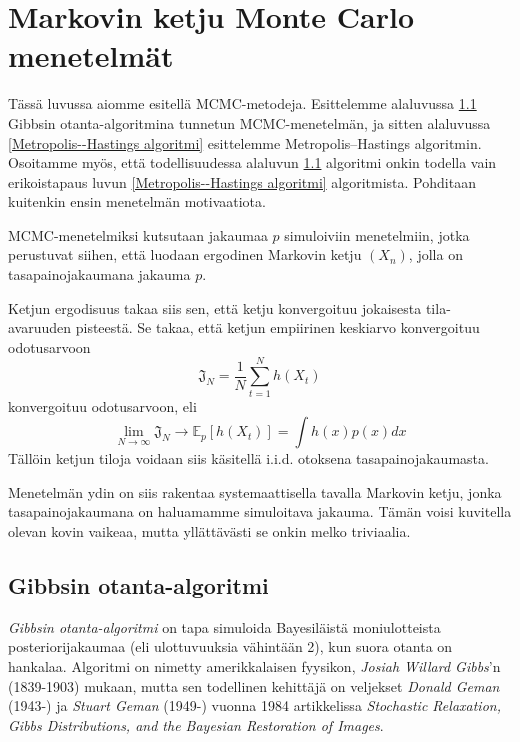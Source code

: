 \chapter{Markovin ketju Monte Carlo menetelmät}

Tässä luvussa aiomme esitellä MCMC-metodeja. Esittelemme alaluvussa \ref{gibbs} Gibbsin otanta-algoritmina tunnetun MCMC-menetelmän, ja sitten alaluvussa \ref{Metropolis--Hastings algoritmi} esittelemme Metropolis--Hastings algoritmin. Osoitamme myös, että todellisuudessa alaluvun \ref{gibbs} algoritmi onkin todella vain erikoistapaus luvun \ref{Metropolis--Hastings algoritmi} algoritmista. Pohditaan kuitenkin ensin menetelmän motivaatiota.
 
\begin{maar}
	MCMC-menetelmiksi kutsutaan jakaumaa $p$ simuloiviin menetelmiin, jotka perustuvat siihen, että luodaan ergodinen Markovin ketju $(X_n)$, jolla on tasapainojakaumana jakauma $p$.
\end{maar}

Ketjun ergodisuus takaa siis sen, että ketju konvergoituu jokaisesta tila-avaruuden pisteestä. Se takaa, että ketjun empiirinen keskiarvo konvergoituu odotusarvoon
\begin{equation}
	\mathfrak{J}_N = \frac{1}{N} \sum_{t=1}^{N} h(X_t)
\end{equation}
konvergoituu odotusarvoon, eli
\begin{equation}
	\lim_{N\to\infty} \mathfrak J_N \to \mathbb{E}_p[h(X_t)] = \int h(x)p(x)dx
\end{equation}
Tällöin ketjun tiloja voidaan siis käsitellä i.i.d. otoksena tasapainojakaumasta.

Menetelmän ydin on siis rakentaa systemaattisella tavalla Markovin ketju, jonka tasapainojakaumana on haluamamme simuloitava jakauma. Tämän voisi kuvitella olevan kovin vaikeaa, mutta yllättävästi se onkin melko triviaalia.

\section{Gibbsin otanta-algoritmi}\label{gibbs}

\textit{Gibbsin otanta-algoritmi} on tapa simuloida Bayesiläistä moniulotteista posteriorijakaumaa (eli ulottuvuuksia vähintään 2), kun suora otanta on hankalaa. Algoritmi on nimetty amerikkalaisen fyysikon, \textit{Josiah Willard Gibbs}'n (1839-1903) mukaan, mutta sen todellinen kehittäjä on veljekset \textit{Donald Geman} (1943-) ja \textit{Stuart Geman} (1949-) vuonna 1984 artikkelissa \textit{Stochastic Relaxation, Gibbs Distributions, and the Bayesian Restoration of Images}.


